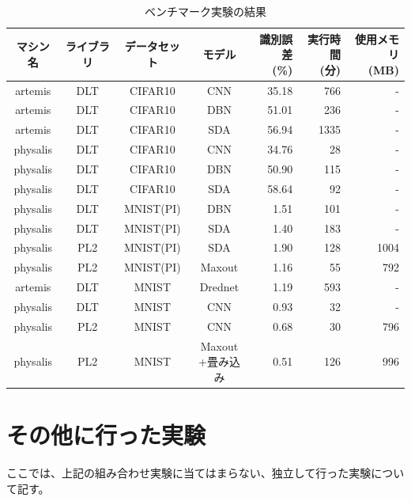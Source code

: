\begin{table}[htbp]
  \centering
  \caption{ベンチマーク実験の結果}
    \begin{tabular}{|c|c|c|c|r|r|r|}\hline
    マシン名 & ライブラリ & データセット & モデル & \shortstack{識別誤差\\(\%)} & \shortstack{実行時間\\(分)} & \shortstack{使用メモリ\\(MB)}\rule[0mm]{0mm}{10mm}\\ \hline
artemis & DLT & CIFAR10 & CNN   & 35.18 & 766   & - \\ \hline
artemis & DLT & CIFAR10 & DBN & 51.01 & 236 &- \\ \hline
artemis & DLT & CIFAR10 & SDA & 56.94 & 1335&- \\ \hline
physalis & DLT & CIFAR10 & CNN & 34.76 & 28&- \\ \hline
physalis & DLT & CIFAR10 & DBN & 50.90& 115 &- \\ \hline
physalis & DLT & CIFAR10 & SDA & 58.64 & 92&- \\ \hline
physalis & DLT & MNIST(PI) & DBN & 1.51& 101 &- \\ \hline
physalis & DLT & MNIST(PI) & SDA & 1.40 & 183 &- \\ \hline
physalis & PL2 & MNIST(PI) & SDA & 1.90 & 128 & 1004 \\ \hline
physalis & PL2 & MNIST(PI) & Maxout & 1.16& 55& 792 \\ \hline
artemis & DLT & MNIST & Drednet & 1.19& 593 &- \\ \hline
physalis & DLT & MNIST & CNN & 0.93& 32&- \\ \hline
physalis & PL2 & MNIST & CNN & 0.68& 30& 796 \\ \hline
physalis & PL2 & MNIST & \shortstack{Maxout\\+畳み込み}\rule[0mm]{0mm}{8mm} & 0.51& 126 & 996 \\ \hline
\end{tabular}%
\label{c5_all_result}%
\end{table}%
\par



\section{その他に行った実験}
ここでは、上記の組み合わせ実験に当てはまらない、独立して行った実験について記す。

